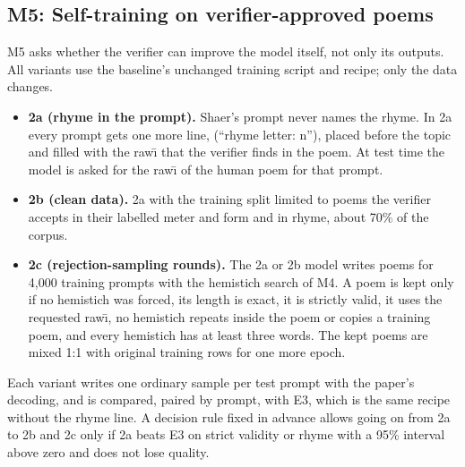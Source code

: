 \subsection{M5: Self-training on verifier-approved poems}
\label{sec:m5}
M5 asks whether the verifier can improve the model itself, not only its outputs. All variants use the baseline's
unchanged training script and recipe; only the data changes.
\begin{itemize}
\item \textbf{2a (rhyme in the prompt).} Shaer's prompt never names the rhyme. In 2a every prompt gets one more line,
 (``rhyme letter: n''), placed before the topic and filled with the raw\={\i} that the verifier finds in
the poem. At test time the model is asked for the raw\={\i} of the human poem for that prompt.
\item \textbf{2b (clean data).} 2a with the training split limited to poems the verifier accepts in their labelled
meter and form and in rhyme, about 70\% of the corpus.
\item \textbf{2c (rejection-sampling rounds).} The 2a or 2b model writes poems for 4,000 training prompts with the
hemistich search of M4. A poem is kept only if no hemistich was forced, its length is exact, it is strictly valid, it
uses the requested raw\={\i}, no hemistich repeats inside the poem or copies a training poem, and every hemistich has at
least three words. The kept poems are mixed 1:1 with original training rows for one more epoch.
\end{itemize}
Each variant writes one ordinary sample per test prompt with the paper's decoding, and is compared, paired by prompt,
with E3, which is the same recipe without the rhyme line. A decision rule fixed in advance allows going on from 2a to
2b and 2c only if 2a beats E3 on strict validity or rhyme with a 95\% interval above zero and does not lose quality.

